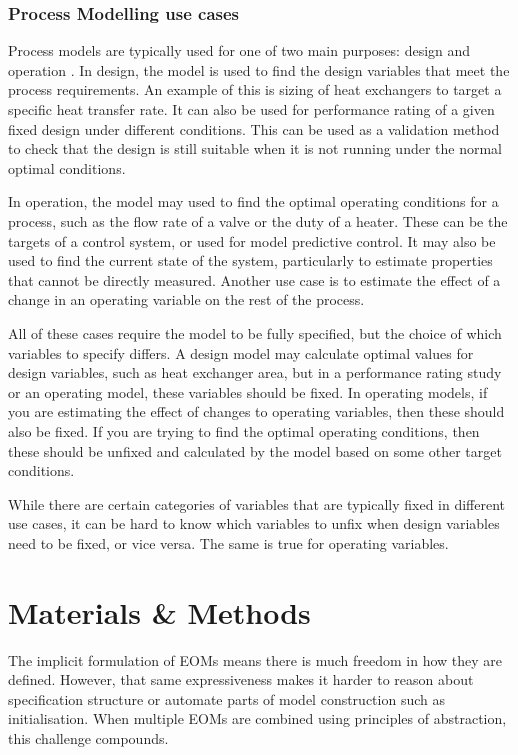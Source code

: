 \hypertarget{methods-of-modelling}{%
\subsubsection{Process Modelling use cases}\label{methods-of-modelling}}

Process models are typically used for one of two main purposes: design and operation \citep{pistikopoulos2021process}.  
In design, the model is used to find the design variables that meet the process requirements. An example of this is sizing of heat exchangers to target a specific heat transfer rate.
It can also be used for performance rating of a given fixed design under different conditions. This can be used as a validation method to check that the design is still suitable when it is not running under the normal optimal conditions.

In operation, the model may used to find the optimal operating conditions for a process, 
such as the flow rate of a valve or the duty of a heater. These can be the targets of a control system, or used for model predictive control. It may also be used to find the current state of the system, particularly to estimate properties that cannot be directly measured. Another use case is to estimate the effect of a change in an operating variable on the rest of the process.

All of these cases require the model to be fully specified, but the choice of which variables to specify differs. A design model may calculate optimal values for design variables, such as heat exchanger area, but in a performance rating study or an operating model, these variables should be fixed. In operating models, if you are estimating the effect of changes to operating variables, then these should also be fixed. If you are trying to find the optimal operating conditions, then these should be unfixed and calculated by the model based on some other target conditions.

While there are certain categories of variables that are typically fixed in different use cases, it can be hard to know which variables to unfix when design variables need to be fixed, or vice versa. The same is true for operating variables. 

\hypertarget{method}{%
\section{Materials \& Methods}\label{method}}

The implicit formulation of EOMs means there is much freedom in how
they are defined. However, that same expressiveness makes it harder to
reason about specification structure or automate parts of model
construction such as initialisation. When multiple EOMs are combined
using principles of abstraction, this challenge compounds.

